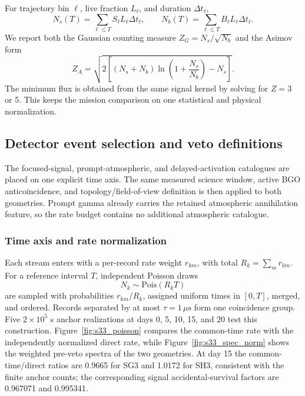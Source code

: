 \documentclass[11pt]{article}
\begin{document}
For trajectory bin $\ell$, live fraction $L_\ell$, and duration $\Delta t_\ell$,
\begin{equation}
 N_s(T)=\sum_{\ell\le T}S_\ell L_\ell\Delta t_\ell,\qquad
 N_b(T)=\sum_{\ell\le T}B_\ell L_\ell\Delta t_\ell.
 \label{eq:cumulative_counts}
\end{equation}
We report both the Gaussian counting measure
$Z_G=N_s/\sqrt{N_b}$ and the Asimov form
\begin{equation}
 Z_A=\sqrt{2\left[(N_s+N_b)\ln\left(1+\frac{N_s}{N_b}\right)-N_s\right]}.
\end{equation}
The minimum flux is obtained from the same signal kernel by solving for
$Z=3$ or 5. This keeps the mission comparison on one statistical and physical
normalization.

\subsection{Detector event selection and veto definitions}
\label{sec:selection}

The focused-signal, prompt-atmospheric, and delayed-activation catalogues
are placed on one explicit time axis. The same measured science window, active
BGO anticoincidence, and topology/field-of-view definition is then applied to
both geometries. Prompt gamma already carries the retained atmospheric
annihilation feature, so the rate budget contains no additional atmospheric
catalogue.

\subsubsection{Time axis and rate normalization}

Each stream enters with a per-record rate weight $r_{km}$, with total
$R_k=\sum_mr_{km}$. For a reference interval $T$, independent Poisson draws
\begin{equation}
 N_k\sim\mathrm{Pois}(R_kT)
\end{equation}
are sampled with probabilities $r_{km}/R_k$, assigned uniform times in $[0,T]$,
merged, and ordered. Records separated by at most $\tau=1\,\mu\mathrm{s}$ form
one coincidence group. Five $2\times10^5$ s anchor realizations at days 0, 5,
10, 15, and 20 test this construction. Figure~\ref{fig:s33_poisson} compares the
common-time rate with the independently normalized direct rate, while
Figure~\ref{fig:s33_spec_norm} shows the weighted pre-veto spectra of the two
geometries. At day 15 the common-time/direct ratios are 0.9665 for SG3 and
1.0172 for SH3, consistent with the finite anchor counts; the corresponding
signal accidental-survival factors are 0.967071 and 0.995341.
\end{document}
